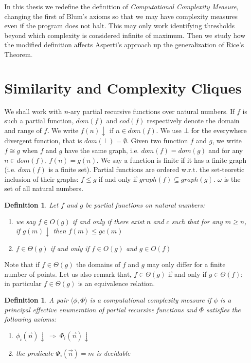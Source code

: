 \documentclass[10pt, a4paper, oneside, titlepage, draft]{article}
\newtheorem{definition}[shrd]{Definition}
\begin{document}
In this thesis we redefine the definition of \textit{Computational Complexity Measure}, changing the first of Blum's axioms so that we may have complexity measures even if the program does not halt. This may only work identifying thresholds beyond which complexity is considered infinite of maximum. Then we study how the modified definition affects Asperti's approach up the generalization of Rice's Theorem.

\section{Similarity and Complexity Cliques}
We shall work with $n$-ary partial recursive functions over natural numbers. If $f$ is such a partial function, $dom(f)$ and $cod(f)$ respectively denote the domain and range of $f$. We write $f(n)\downarrow$ if $n \in dom(f)$. We use $\bot$ for the everywhere divergent function, that is $dom(\bot) = \emptyset$. Given two function $f$ and $g$, we write $f \cong g$ when $f$ and $g$ have the same graph, i.e. $dom(f)=dom(g)$ and for any $n \in dom(f)$, $f(n)=g(n)$. We say a function is finite if it has a finite graph (i.e. $dom(f)$ is a finite set). Partial functions are ordered w.r.t. the set-teoretic inclusion of their graphs: $f \le g$ if and only if $graph(f) \subseteq graph(g)$. $\omega$ is the set of all natural numbers.

\begin{definition}
    Let $f$ and $g$ be partial functions on natural numbers:
    \begin{enumerate}
        \item we say $f \in O(g)$ if and only if there exist $n$ and $c$ such that for any $m \ge n$, if $g(m)\downarrow$ then $f(m) \le gc(m)$
        \item $f \in \Theta(g)$ if and only if $f \in O(g)$ and $g \in O(f)$
    \end{enumerate}
\end{definition}

Note that if $f \in \Theta(g)$ the domains of $f$ and $g$ may only differ for a finite number of points.
Let us also remark that, $f \in \Theta(g)$ if and only if $g \in \Theta(f)$; in particular $f \in \Theta(g)$ is an equivalence relation.

\begin{definition}
    A pair $\langle \phi, \Phi \rangle$ is a \textit{computational complexity measure} if $\phi$ is a principal effective enumeration of partial recursive functions and $\Phi$ satisfies the following axioms: 
    \begin{enumerate}[label=(\alph*)]
        \item $ \phi_i(\vec{n})\downarrow \ \Rightarrow \ \Phi_i(\vec{n}) \downarrow $ 
        \item \textit{the predicate $ \Phi_i(\vec{n}) = m $ is decidable}
    \end{enumerate}
\end{definition}
\end{document}

